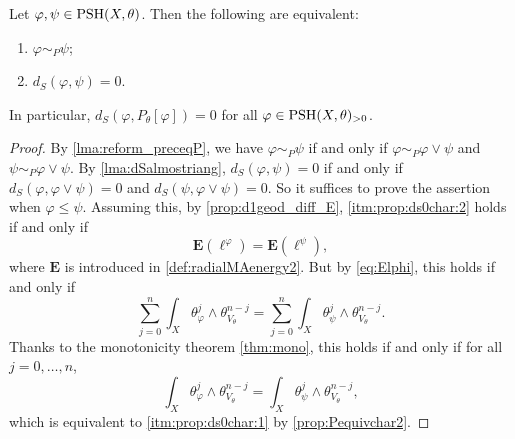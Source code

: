 \begin{proposition}\label{prop:ds0char}
    Let $\varphi,\psi\in \mathrm{PSH}(X,\theta)$. Then the following are equivalent:
    \begin{enumerate}
        \item\label{itm:prop:ds0char:1} $\varphi\sim_P \psi$;
        \item\label{itm:prop:ds0char:2} $d_S(\varphi,\psi)=0$.
    \end{enumerate}

    In particular, $d_S(\varphi,P_{\theta}[\varphi])=0$ for all $\varphi\in \mathrm{PSH}(X,\theta)_{>0}$.
\end{proposition}
\begin{proof}
    By \cref{lma:reform_preceqP}, we have $\varphi\sim_P \psi$ if and only if $\varphi\sim_P \varphi\lor \psi$ and $\psi\sim_P \varphi\lor \psi$. By \cref{lma:dSalmostriang}, $d_S(\varphi,\psi)=0$ if and only if $d_S(\varphi,\varphi\lor \psi)=0$ and $d_S(\psi,\varphi\lor \psi)=0$. So it suffices to prove the assertion when $\varphi\leq \psi$. Assuming this, by \cref{prop:d1geod_diff_E}, \ref{itm:prop:ds0char:2} holds if and only if
    \[
        \mathbf{E}\left(\ell^{\varphi}\right)=  \mathbf{E}\left(\ell^{\psi}\right),
    \]
    where $\mathbf{E}$ is introduced in \cref{def:radialMAenergy2}.
    But by \eqref{eq:Elphi}, this holds if and only if
    \[
        \sum_{j=0}^n \int_X \theta_{\varphi}^j\wedge \theta_{V_{\theta}}^{n-j}=\sum_{j=0}^n \int_X \theta_{\psi}^j\wedge \theta_{V_{\theta}}^{n-j}.
    \]
    Thanks to the monotonicity theorem \cref{thm:mono}, this holds if and only if for all $j=0,\ldots,n$,
    \[
        \int_X \theta_{\varphi}^j\wedge \theta_{V_{\theta}}^{n-j}=\int_X \theta_{\psi}^j\wedge \theta_{V_{\theta}}^{n-j},
    \]
    which is equivalent to \ref{itm:prop:ds0char:1} by \cref{prop:Pequivchar2}.
\end{proof}


